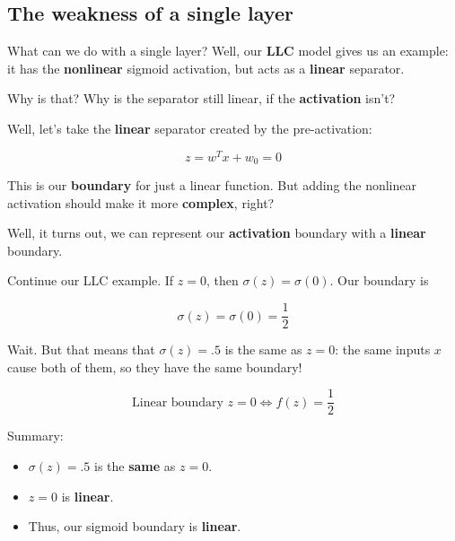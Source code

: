     \subsection{The weakness of a single layer}
    
        What can we do with a single layer? Well, our \textbf{LLC} model gives us an example: it has the \textbf{nonlinear} sigmoid activation, but acts as a \textbf{linear} separator.
        
        Why is that? Why is the separator still linear, if the \textbf{activation} isn't?
        
        Well, let's take the \textbf{linear} separator created by the pre-activation:
        
        \begin{equation}
            z = w^T x + w_0 = 0 
        \end{equation}
        
        This is our \textbf{boundary} for just a linear function. But adding the nonlinear activation should make it more \textbf{complex}, right? 
        
        Well, it turns out, we can represent our \textbf{activation} boundary with a \textbf{linear} boundary.
        
        \miniex Continue our LLC example. If $z=0$, then $\sigma(z) = \sigma(0)$. Our boundary is
        
        \begin{equation}
            \sigma(z)=\sigma(0)=\frac{1}{2}
        \end{equation}
        
        Wait. But that means that $\sigma(z)=.5$ is the same as $z=0$: the same inputs $x$ cause both of them, so they have the same boundary!
        
        \begin{equation}
            \text{Linear boundary } z=0 \Longleftrightarrow f(z)=\frac{1}{2}
        \end{equation}
        
        Summary:
        
        \begin{itemize}
            \item $\sigma(z)=.5$ is the \textbf{same} as $z=0$.
            \item $z=0$ is \textbf{linear}.
            \item Thus, our sigmoid boundary is \textbf{linear}.
        \end{itemize}
        
